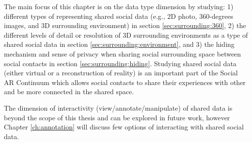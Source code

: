 The main focus of this chapter is on the data type dimension by studying: 1) different types of representing shared social data (e.g., 2D photo, 360-degrees images, and 3D surrounding environment) in section \ref{sec:surrounding:360}, 2) the different levels of detail or resolution of 3D surrounding environments as a type of shared social data in section \ref{sec:surrounding:environment}, and 3) the hiding mechanism and sense of privacy when sharing social surrounding space between social contacts in section \ref{sec:surrounding:hiding}. Studying shared social data (either virtual or a reconstruction of reality) is an important part of the Social AR Continuum which allows social contacts to share their experiences with other and be more connected in the shared space. 

The dimension of interactivity (view/annotate/manipulate) of shared data is beyond the scope of this thesis and can be explored in future work, however Chapter \ref{ch:annotation} will discuss few options of interacting with shared social data.






